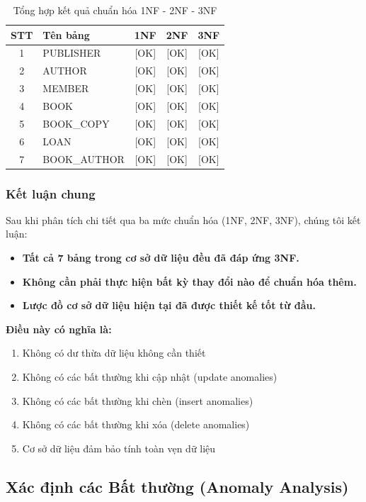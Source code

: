 \documentclass[12pt,a4paper]{article}
\begin{document}
\begin{table}[H]
\centering
\caption{Tổng hợp kết quả chuẩn hóa 1NF - 2NF - 3NF}
\begin{tabular}{|c|l|c|c|c|}
\hline
\textbf{STT} & \textbf{Tên bảng} & \textbf{1NF} & \textbf{2NF} & \textbf{3NF} \\ \hline
1 & PUBLISHER & [OK] & [OK] & [OK] \\ \hline
2 & AUTHOR & [OK] & [OK] & [OK] \\ \hline
3 & MEMBER & [OK] & [OK] & [OK] \\ \hline
4 & BOOK & [OK] & [OK] & [OK] \\ \hline
5 & BOOK\_COPY & [OK] & [OK] & [OK] \\ \hline
6 & LOAN & [OK] & [OK] & [OK] \\ \hline
7 & BOOK\_AUTHOR & [OK] & [OK] & [OK] \\ \hline
\end{tabular}
\end{table}

\subsubsection{Kết luận chung}

Sau khi phân tích chi tiết qua ba mức chuẩn hóa (1NF, 2NF, 3NF), chúng tôi kết luận:

\begin{itemize}
    \item \textbf{Tất cả 7 bảng trong cơ sở dữ liệu đều đã đáp ứng 3NF.}
    \item \textbf{Không cần phải thực hiện bất kỳ thay đổi nào để chuẩn hóa thêm.}
    \item \textbf{Lược đồ cơ sở dữ liệu hiện tại đã được thiết kế tốt từ đầu.}
\end{itemize}

\textbf{Điều này có nghĩa là:}
\begin{enumerate}
    \item Không có dư thừa dữ liệu không cần thiết
    \item Không có các bất thường khi cập nhật (update anomalies)
    \item Không có các bất thường khi chèn (insert anomalies)
    \item Không có các bất thường khi xóa (delete anomalies)
    \item Cơ sở dữ liệu đảm bảo tính toàn vẹn dữ liệu
\end{enumerate}

\subsection{Xác định các Bất thường (Anomaly Analysis)}
\end{document}
